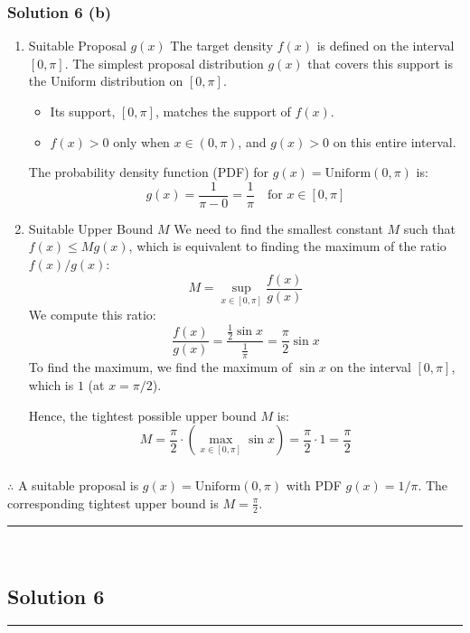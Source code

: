 \documentclass{article}
\begin{document}
\subsubsection*{Solution 6 (b)}
\begin{enumerate}
    \item Suitable Proposal $g(x)$
    The target density $f(x)$ is defined on the interval $[0, \pi]$. The simplest proposal distribution $g(x)$ that covers this support is the Uniform distribution on $[0, \pi]$.
    \begin{itemize}
        \item Its support, $[0, \pi]$, matches the support of $f(x)$.
        \item $f(x) > 0$ only when $x \in (0, \pi)$, and $g(x) > 0$ on this entire interval.
    \end{itemize}
The probability density function (PDF) for $g(x) = \text{Uniform}(0, \pi)$ is:
$$
g(x) = \frac{1}{\pi - 0} = \frac{1}{\pi} \quad \text{for } x \in [0, \pi]
$$
    \item Suitable Upper Bound $M$
We need to find the smallest constant $M$ such that $f(x) \le M g(x)$, which is equivalent to finding the maximum of the ratio $f(x)/g(x)$:
$$
M = \sup_{x \in [0, \pi]} \frac{f(x)}{g(x)}
$$
We compute this ratio:
$$
\frac{f(x)}{g(x)} = \frac{\frac{1}{2} \sin x}{\frac{1}{\pi}} = \frac{\pi}{2} \sin x
$$
To find the maximum, we find the maximum of $\sin x$ on the interval $[0, \pi]$, which is $1$ (at $x = \pi/2$).

Hence, the tightest possible upper bound $M$ is:
$$
M = \frac{\pi}{2} \cdot \left( \max_{x \in [0, \pi]} \sin x \right) = \frac{\pi}{2} \cdot 1 = \frac{\pi}{2}
$$
\end{enumerate}

\subsubsection*{\normalfont}{$\therefore$ A suitable proposal is $g(x) = \text{Uniform}(0, \pi)$ with PDF $g(x) = 1/\pi$. The corresponding tightest upper bound is $M = \frac{\pi}{2}$.}

\noindent\rule{\textwidth}{0.4pt}\\

\newpage

\subsection*{Solution 6}
\noindent\rule{\textwidth}{0.4pt}\\
\end{document}
